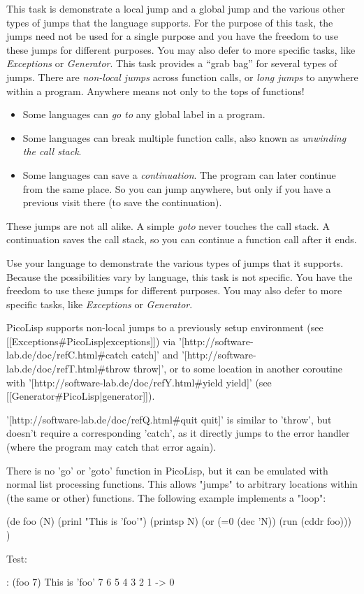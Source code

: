 This task is demonstrate a local jump and a global jump and the
various other types of jumps that the language supports. For the
purpose of this task, the jumps need not be used for a single purpose
and you have the freedom to use these jumps for different purposes.
You may also defer to more specific tasks, like \emph{Exceptions} or
\emph{Generator}. This task provides a ``grab bag'' for several types
of jumps. There are \emph{non-local jumps} across function calls, or
\emph{long jumps} to anywhere within a program. Anywhere means not
only to the tops of functions!

\begin{itemize}
\item
  Some languages can \emph{go to} any global label in a program.
\item
  Some languages can break multiple function calls, also known as
  \emph{unwinding the call stack}.
\item
  Some languages can save a \emph{continuation}. The program can later
  continue from the same place. So you can jump anywhere, but only if
  you have a previous visit there (to save the continuation).
\end{itemize}

These jumps are not all alike. A simple \emph{goto} never touches the
call stack. A continuation saves the call stack, so you can continue a
function call after it ends.

Use your language to demonstrate the various types of jumps that it
supports. Because the possibilities vary by language, this task is not
specific. You have the freedom to use these jumps for different
purposes. You may also defer to more specific tasks, like
\emph{Exceptions} or \emph{Generator}.

\begin{wideverbatim}

PicoLisp supports non-local jumps to a previously setup environment (see
[[Exceptions#PicoLisp|exceptions]]) via
'[http://software-lab.de/doc/refC.html#catch catch]' and
'[http://software-lab.de/doc/refT.html#throw throw]', or to some location in
another coroutine with '[http://software-lab.de/doc/refY.html#yield yield]' (see
[[Generator#PicoLisp|generator]]).

'[http://software-lab.de/doc/refQ.html#quit quit]' is similar to 'throw', but
doesn't require a corresponding 'catch', as it directly jumps to the error
handler (where the program may catch that error again).

There is no 'go' or 'goto' function in PicoLisp, but it can be emulated with
normal list processing functions. This allows "jumps" to arbitrary locations
within (the same or other) functions. The following example implements a "loop":

(de foo (N)
   (prinl "This is 'foo'")
   (printsp N)
   (or (=0 (dec 'N)) (run (cddr foo))) )

Test:

: (foo 7)
This is 'foo'
7 6 5 4 3 2 1 -> 0

\end{wideverbatim}



% 
